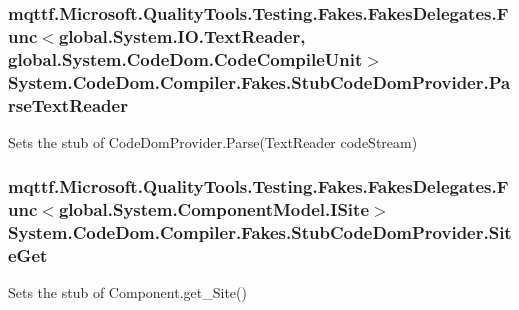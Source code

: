 \hypertarget{class_system_1_1_code_dom_1_1_compiler_1_1_fakes_1_1_stub_code_dom_provider_a040e9aa13ba9cc97ff7b5655461c6da1}{
\subsubsection[{Parse\-Text\-Reader}]{\setlength{\rightskip}{0pt plus 5cm}mqttf.\-Microsoft.\-Quality\-Tools.\-Testing.\-Fakes.\-Fakes\-Delegates.\-Func$<$global.\-System.\-I\-O.\-Text\-Reader, global.\-System.\-Code\-Dom.\-Code\-Compile\-Unit$>$ System.\-Code\-Dom.\-Compiler.\-Fakes.\-Stub\-Code\-Dom\-Provider.\-Parse\-Text\-Reader}}\label{class_system_1_1_code_dom_1_1_compiler_1_1_fakes_1_1_stub_code_dom_provider_a040e9aa13ba9cc97ff7b5655461c6da1}


Sets the stub of Code\-Dom\-Provider.\-Parse(\-Text\-Reader code\-Stream)

\hypertarget{class_system_1_1_code_dom_1_1_compiler_1_1_fakes_1_1_stub_code_dom_provider_afe0b499b0b99061510a4e0fcc36baa6c}{
\subsubsection[{Site\-Get}]{\setlength{\rightskip}{0pt plus 5cm}mqttf.\-Microsoft.\-Quality\-Tools.\-Testing.\-Fakes.\-Fakes\-Delegates.\-Func$<$global.\-System.\-Component\-Model.\-I\-Site$>$ System.\-Code\-Dom.\-Compiler.\-Fakes.\-Stub\-Code\-Dom\-Provider.\-Site\-Get}}\label{class_system_1_1_code_dom_1_1_compiler_1_1_fakes_1_1_stub_code_dom_provider_afe0b499b0b99061510a4e0fcc36baa6c}


Sets the stub of Component.\-get\-\_\-\-Site()

